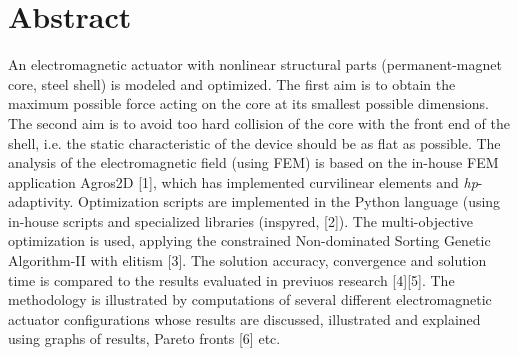 \documentclass[article,A4,11pt]{llncs}%
\begin{document}
\section*{Abstract}
An electromagnetic actuator with nonlinear structural parts (permanent-magnet core, steel shell) is modeled and optimized. The first aim is to obtain the maximum possible force acting on the core at its smallest possible dimensions. The second aim is to avoid too hard collision of the core with the front end of the shell, i.e. the static characteristic of the device should be as flat as possible. The analysis of the electromagnetic field (using FEM) is based on the in-house FEM application Agros2D [1], which has implemented curvilinear elements and \textit{hp}-adaptivity. Optimization scripts are implemented in the Python language (using in-house scripts and specialized libraries (inspyred, [2]). The multi-objective optimization is used, applying the constrained Non-dominated Sorting Genetic Algorithm-II with elitism [3]. The solution accuracy, convergence and solution time is compared to the results evaluated in previuos research [4][5]. The methodology is illustrated by computations of several different electromagnetic actuator configurations whose results are discussed, illustrated and explained using graphs of results, Pareto fronts [6] etc.
\end{document}
